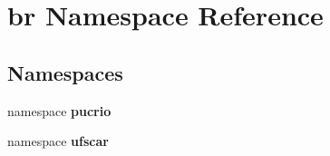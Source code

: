 \section{br Namespace Reference}
\label{namespacebr}


\subsection*{Namespaces}
\begin{CompactItemize}
\item 
namespace {\bf pucrio}
\item 
namespace {\bf ufscar}
\end{CompactItemize}
